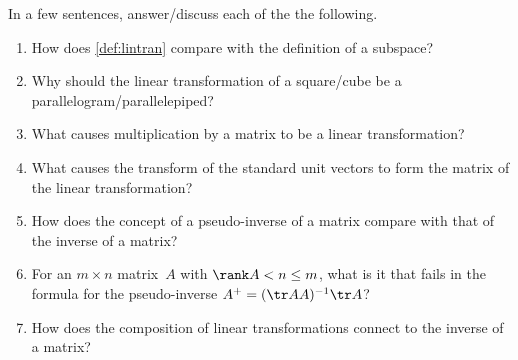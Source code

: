 \begin{exercise} \label{ex:} 
In a few sentences, answer\slash discuss each of the the following.
\begin{enumerate}
\item How does \autoref{def:lintran} compare with the definition of a subspace?

\item Why should the linear transformation of a square\slash cube be a parallelogram\slash parallelepiped?

\item What causes multiplication by a matrix to be a linear transformation?

\item What causes the transform of the standard unit vectors to form the matrix of the linear transformation?

\item How does the concept of a pseudo-inverse of a matrix compare with that of the inverse of a matrix?

\item For an \(m\times n\) matrix~\(A\) with \(\rank A<n\leq m\), what is it that fails in the formula for the pseudo-inverse \(A^+=(\tr AA)^{-1}\tr A\)?

\item How does the composition of linear transformations connect to the inverse of a matrix?

\end{enumerate}
\end{exercise}

\begin{comment}%
why, what caused X?
how did X occur?
what-if? what-if-not?
how does X compare with Y?
what is the evidence for X?
why is X important?
\end{comment}

